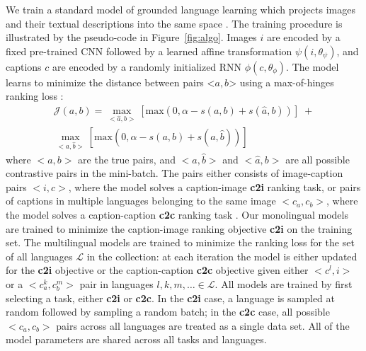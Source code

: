 We train a standard model of grounded language learning which  projects images and their textual descriptions into the same space \citep{kiros2014unifying,karpathy2015deep}.
The training procedure is illustrated by the pseudo-code in Figure~\ref{fig:algo}.
Images $i$ are encoded by a fixed pre-trained CNN followed by a learned affine transformation $\psi(i, \theta_\psi)$, and captions $c$ are encoded by a randomly initialized RNN $\phi(c, \theta_\phi)$.
The model learns to minimize the distance between pairs $\textrm{<}a,b\textrm{>}$ using a max-of-hinges ranking loss \citep{faghri2017vse++}:
%
\begin{equation*}
\begin{split}
\mathcal{J}(a, b) = \max_{<\hat{a}, b>}[\text{max}(0, \alpha - s(a,b) + s(\hat{a}, b))] \;+ \\ \max_{<a, \hat{b}>}[\text{max}(0, \alpha - s(a,b) + s(a, \hat{b}))]
\end{split}
\end{equation*}
%
where $<a, b>$ are the true pairs, and $<a, \hat{b}>$ and $<\hat{a}, b>$ are all possible contrastive pairs in the mini-batch.
The pairs either consists of image-caption pairs $<i , c>$, where the model solves a caption-image  {\bf c2i} ranking task, or pairs of
captions in multiple languages belonging to the same image $<c_a, c_b>$, where the model solves a caption-caption {\bf c2c} ranking task \citep{gella2017image}.
Our monolingual models are trained to minimize the caption-image
ranking objective {\bf c2i} on the training set.
The multilingual models are trained to minimize the ranking loss for the set of all languages $\mathcal{L}$ in the collection: at each iteration the model is either updated for the {\bf c2i} objective or the caption-caption {\bf c2c} objective given either $<c^l, i>$ or a  $<c^k_a, c^m_b>$ pair in languages $l,k,m, \ldots \in \mathcal{L}$. All models are trained by first selecting a task, either {\bf c2i} or {\bf c2c}. In the {\bf c2i} case, a language is sampled at random followed by sampling a random batch; in the {\bf c2c} case, all possible $<c_a, c_b>$ pairs across all languages are treated as a single data set. All of the model parameters are shared across all tasks and languages.


